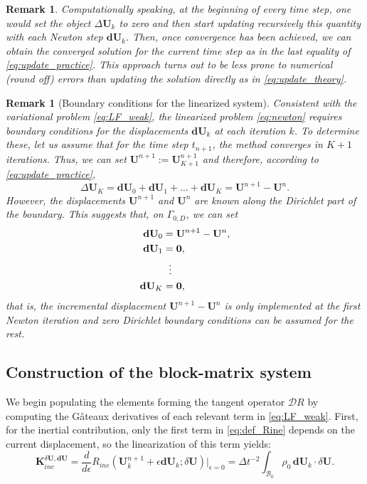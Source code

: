 \documentclass{sfuthesis}
\numberwithin{equation}{section}
\numberwithin{figure}{chapter}
\numberwithin{table}{chapter}
\newtheorem{remark}[theorem]{Remark}
\theoremstyle{definition}
\def\*#1{{\mathbf{#1}}} %
\newcommand{\der}[2]{\dfrac{d #1}{d #2}}
\newcommand{\B}{\mathcal{B}}
\begin{document}
\begin{remark}
Computationally speaking, at the beginning of every time step, one would set the object $\Delta \*U_k$ to zero and then start updating recursively this quantity with each Newton step $\*d \*U_k$. Then, once convergence has been achieved, we can obtain the converged solution for the current time step as in the last equality of \eqref{eq:update_practice}. This approach turns out to be less prone to numerical (round off) errors than updating the solution directly as in \eqref{eq:update_theory}.
\end{remark}

\begin{remark}[Boundary conditions for the linearized system]
    Consistent with the variational problem \eqref{eq:LF_weak}, the linearized problem \eqref{eq:newton} requires boundary conditions for the displacements $\*d \*U_k$ at each iteration $k$. To determine these, let us assume that for the time step $t_{n+1}$, the method converges in $K+1$ iterations. Thus, we can set $\*U^{n+1} := \*U_{K+1}^{n+1}$ and therefore, according to \eqref{eq:update_practice},
    \[
    \Delta \*U_K = \*d\*U_0 + \*d\*U_1 + \dots + \*d\*U_K = \*U^{n+1} - \*U^n.
    \]
    However, the displacements $\*U^{n+1}$ and $\*U^n$ are known along the Dirichlet part of the boundary. This suggests that, on $\Gamma_{0,D}$, we can set
    \begin{equation}
    \begin{aligned}
    \*d\*U_0 &= \*U^{n+1} - \*U^n, \\
    \*d\*U_1 &= \*0,  \\
    &\hspace{0.6em}\vdots \\
    \*d\*U_K &= \*0,
    \end{aligned}
    \end{equation}
    that is, the incremental displacement $\*U^{n+1}-\*U^n$ is only implemented at the first Newton iteration and zero Dirichlet boundary conditions can be assumed for the rest.
\end{remark}

\subsection{Construction of the block-matrix system}

We begin populating the elements forming the tangent operator $\bm{\mathcal{D}} R$ by computing the G\^{a}teaux derivatives of each relevant term in \eqref{eq:LF_weak}. First, for the inertial contribution, only the first term in \eqref{eq:def_Rine} depends on the current displacement, so the linearization of this term yields:
\begin{equation}
    \*K_{ine}^{\delta \*U, \*d \*U} = \der{}{\epsilon}R_{ine}(\*U_k^{n+1} + \epsilon \*d\*U_k ; \delta\*U) \Big|_{\epsilon = 0} = \Delta t^{-2} \int_{\B_0} \rho_0 \, \*d\*U_k \cdot \delta \*U.
\end{equation}
\end{document}
